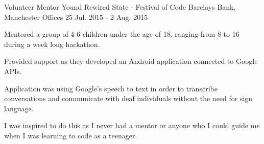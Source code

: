 \begin{cventries}
  \cventry
    {Volunteer Mentor} %
    {Yound Rewired State - Festival of Code} %
    {Barclays Bank, Manchester Offices} %
    {25 Jul. 2015 - 2 Aug. 2015} %
    {
      \begin{cvitems} %
        \item {Mentored a group of 4-6 children under the age of 18, ranging from 8 to 16 during a week long hackathon.}
        \item {Provided support as they developed an Android application connected to Google APIs.}
        \item {Application was using Google's speech to text in order to transcribe conversations and communicate with deaf individuals without the need for sign language.}
        \item {I was inspired to do this as I never had a mentor or anyone who I could guide me when I was learning to code as a teenager.}
      \end{cvitems}
    }

\end{cventries}
